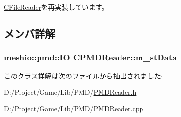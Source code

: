 \hyperlink{class_c_file_reader_a5a18550133826ac43096629f6eaa8c42}{C\+File\+Reader}を再実装しています。



\subsection{メンバ詳解}
\hypertarget{class_c_p_m_d_reader_aaecdb1ffd39ffe2cb5c87597c581173f}{}
\subsubsection[{m\+\_\+st\+Data}]{\setlength{\rightskip}{0pt plus 5cm}meshio\+::pmd\+::\+I\+O C\+P\+M\+D\+Reader\+::m\+\_\+st\+Data\hspace{0.3cm}{\ttfamily [private]}}\label{class_c_p_m_d_reader_aaecdb1ffd39ffe2cb5c87597c581173f}


このクラス詳解は次のファイルから抽出されました\+:\begin{DoxyCompactItemize}
\item 
D\+:/\+Project/\+Game/\+Lib/\+P\+M\+D/\hyperlink{_p_m_d_reader_8h}{P\+M\+D\+Reader.\+h}\item 
D\+:/\+Project/\+Game/\+Lib/\+P\+M\+D/\hyperlink{_p_m_d_reader_8cpp}{P\+M\+D\+Reader.\+cpp}\end{DoxyCompactItemize}

